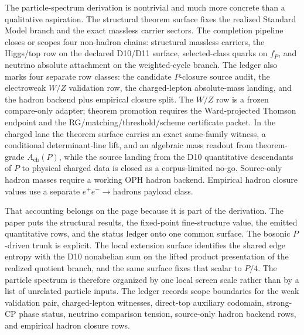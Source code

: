 \documentclass[11pt]{article}
\begin{document}
The particle-spectrum derivation is nontrivial and much more concrete than a qualitative aspiration.
The structural theorem surface fixes the realized Standard Model branch and the exact massless
carrier sectors. The completion pipeline closes or scopes four non-hadron chains: structural
massless carriers, the Higgs/top row on the declared D10/D11 surface, selected-class quarks on
\(f_P\), and neutrino absolute attachment on the weighted-cycle branch. The ledger also marks four
separate row classes: the candidate \(P\)-closure source audit, the electroweak \(W/Z\) validation
row, the charged-lepton absolute-mass landing, and the hadron backend plus empirical closure split.
The \(W/Z\) row is a frozen compare-only adapter; theorem promotion requires the Ward-projected
Thomson endpoint and the RG/matching/threshold/scheme certificate packet. In the charged lane the theorem surface carries an exact
same-family witness, a conditional determinant-line lift, and an algebraic mass readout from
theorem-grade \(A_{\mathrm{ch}}(P)\), while the source landing from the D10 quantitative
descendants of \(P\) to physical charged data is closed as a corpus-limited no-go. Source-only
hadron masses require a working OPH hadron backend. Empirical hadron closure values use a
separate \(e^+e^-\to\mathrm{hadrons}\) payload class.

That accounting belongs on the page because it is part of the derivation. The paper puts the
structural results, the fixed-point fine-structure value, the emitted quantitative rows, and the
status ledger onto one common surface. The bosonic \(P\)-driven trunk is explicit. The local
extension surface identifies the shared edge entropy with the D10 nonabelian sum on the lifted
product presentation of the realized quotient branch, and the same surface fixes that scalar to
\(P/4\). The particle spectrum is therefore organized by one local screen scale rather than by a
list of unrelated particle inputs. The ledger records scope boundaries for the weak validation
pair, charged-lepton witnesses, direct-top auxiliary codomain, strong-CP phase status,
neutrino comparison tension, source-only hadron backend rows, and empirical hadron closure rows.

\appendix

\end{document}
